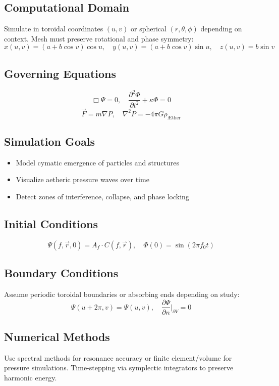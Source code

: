 \documentclass[12pt]{book}
\begin{document}
\subsection*{Computational Domain}
Simulate in toroidal coordinates $(u, v)$ or spherical $(r, \theta, \phi)$ depending on context. Mesh must preserve rotational and phase symmetry:
\[
x(u,v) = (a + b \cos v) \cos u, \quad y(u,v) = (a + b \cos v) \sin u, \quad z(u,v) = b \sin v
\]

\subsection*{Governing Equations}
\[
\Box \Psi = 0, \quad \frac{\partial^2 \Phi}{\partial t^2} + \kappa \Phi = 0
\]
\[
\vec{F} = m \nabla P, \quad \nabla^2 P = -4\pi G \rho_{\text{Æther}}
\]

\subsection*{Simulation Goals}
\begin{itemize}
  \item Model cymatic emergence of particles and structures
  \item Visualize aetheric pressure waves over time
  \item Detect zones of interference, collapse, and phase locking
\end{itemize}

\subsection*{Initial Conditions}
\[
\Psi(f, \vec{r}, 0) = A_f \cdot C(f, \vec{r}), \quad \Phi(0) = \sin(2\pi f_0 t)
\]

\subsection*{Boundary Conditions}
Assume periodic toroidal boundaries or absorbing ends depending on study:
\[
\Psi(u + 2\pi, v) = \Psi(u, v), \quad \frac{\partial \Psi}{\partial n}\big|_{\partial V} = 0
\]

\subsection*{Numerical Methods}
Use spectral methods for resonance accuracy or finite element/volume for pressure simulations. Time-stepping via symplectic integrators to preserve harmonic energy.
\end{document}

